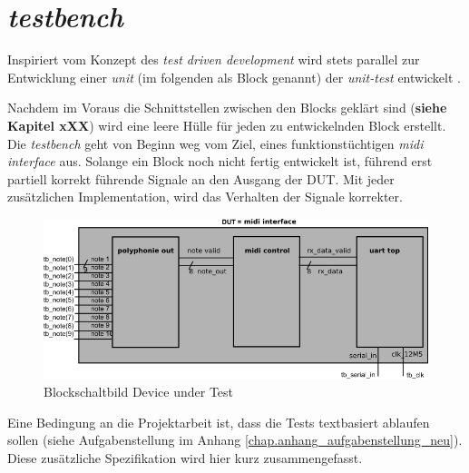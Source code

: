
\chapter{\textit{testbench}}\label{chap.testen}
Inspiriert vom Konzept des \textit{test driven development} wird stets parallel zur Entwicklung einer \textit{unit} (im folgenden als Block genannt) der \textit{unit-test} entwickelt \cite{Testdriven}.

Nachdem im Voraus die Schnittstellen zwischen den Blocks geklärt sind (\textbf{siehe Kapitel xXX}) wird eine leere Hülle für jeden zu entwickelnden Block erstellt. Die \textit{testbench} geht von Beginn weg vom Ziel, eines funktionstüchtigen \textit{midi interface} aus. Solange ein Block noch nicht fertig entwickelt ist, führend erst partiell korrekt führende Signale an den Ausgang der DUT. Mit jeder zusätzlichen Implementation, wird das Verhalten der Signale korrekter.\\

\begin{figure}[H]
	\centering
	\includegraphics[width=1\textwidth]{images/midi_interface/testbench_midiinterface.png}
	\caption{Blockschaltbild Device under Test}
	\label{fig.testbench}
\end{figure}

Eine Bedingung an die Projektarbeit ist, dass die Tests textbasiert ablaufen sollen (siehe Aufgabenstellung im Anhang \ref{chap.anhang_aufgabenstellung_neu}). Diese zusätzliche Spezifikation wird hier kurz zusammengefasst.

